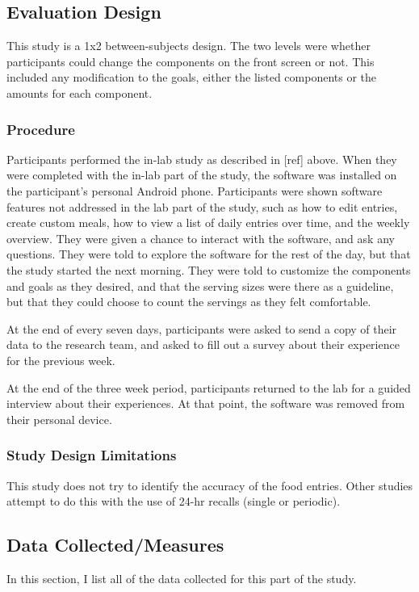 \subsection{Evaluation Design}
This study is a 1x2 between-subjects design. The two levels were whether participants could change the components on the front screen or not. This included any modification to the goals, either the listed components or the amounts for each component. 

\subsubsection{Procedure}
Participants performed the in-lab study as described in [ref] above. When they were completed with the in-lab part of the study, the software was installed on the participant's personal Android phone. Participants were shown software features not addressed in the lab part of the study, such as how to edit entries, create custom meals, how to view a list of daily entries over time, and the weekly overview. They were given a chance to interact with the software, and ask any questions. They were told to explore the software for the rest of the day, but that the study started the next morning. They were told to customize the components and goals as they desired, and that the serving sizes were there as a guideline, but that they could choose to count the servings as they felt comfortable. 

At the end of every seven days, participants were asked to send a copy of their data to the research team, and asked to fill out a survey about their experience for the previous week. 

At the end of the three week period, participants returned to the lab for a guided interview about their experiences. At that point, the software was removed from their personal device. 

\subsubsection{Study Design Limitations}

This study does not try to identify the accuracy of the food entries. Other studies attempt to do this with the use of 24-hr recalls (single or periodic). 

\subsection{Data Collected/Measures}
In this section, I list all of the data collected for this part of the study. 

